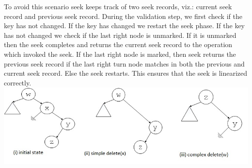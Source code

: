 \documentclass[11pt]{article}
\begin{document}
\begin{multicols}{2}
To avoid this scenario seek keeps track of two seek records, viz.: current seek record and previous seek record. During the validation step, we first check if the key has not changed. If the key has changed we restart the seek phase. If the key has not changed we check if the last right node is unmarked. If it is unmarked then the seek completes and returns the current seek record to the operation which invoked the seek. If the last right node is marked, then seek returns the previous seek record if the last right turn node matches in both the previous and current seek record. Else the seek restarts. This ensures that the seek is linearized correctly.
\includegraphics[width=1.0\linewidth]{seek.jpg}

\end{multicols}
\end{document}
